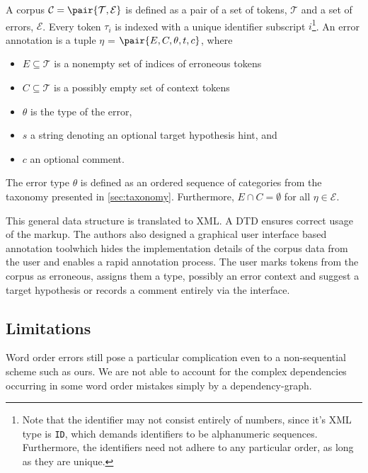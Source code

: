 \documentclass{article}
\begin{document}
\begin{definition}\label{def:errorformat}

A corpus $\mathcal{C}=\pair{\mathcal{T},\mathcal{E}}$ is defined as a pair of
a set of tokens, $\mathcal{T}$ and a 
set of errors, $\mathcal{E}$. Every token $\tau_i$ is indexed with a unique
identifier subscript $i$\footnote{Note that the identifier may not consist entirely of
numbers, since it's XML type is \texttt{ID}, which demands identifiers to be
alphanumeric sequences. Furthermore, the identifiers need not adhere to any
particular order, as long as they are unique.}.
An error annotation is a tuple $\eta$ = $\pair{E,C,\theta,t,c}$, where
\begin{itemize}
  \item $E \subseteq \mathcal{T}$ is a nonempty set of indices of erroneous tokens
  \item $C \subseteq \mathcal{T}$ is a possibly empty set of context tokens
  \item $\theta$ is the type of the error,
  \item $s$ a string denoting an optional target hypothesis hint, and
  \item $c$ an optional comment.
\end{itemize}

The error type $\theta$ is defined as an ordered sequence of categories from the
taxonomy presented in \ref{sec:taxonomy}. Furthermore, $E \cap C = \emptyset$
for all $\eta\in\mathcal{E}$.

\end{definition}

This general data structure is translated to XML. A DTD ensures correct usage of
the markup. The authors also designed a graphical user interface based
annotation tool\footnotemark which hides the implementation details of the
corpus data from the user and enables a rapid annotation process. The user marks
tokens from the corpus as erroneous, assigns them a type, possibly an error
context and suggest a target hypothesis or records a comment entirely via the
interface.


\subsection{Limitations}
Word order errors still pose a particular complication even to a non-sequential
scheme such as ours. We are not able to account for the complex dependencies
occurring in some word order mistakes simply by a dependency-graph.
\end{document}
